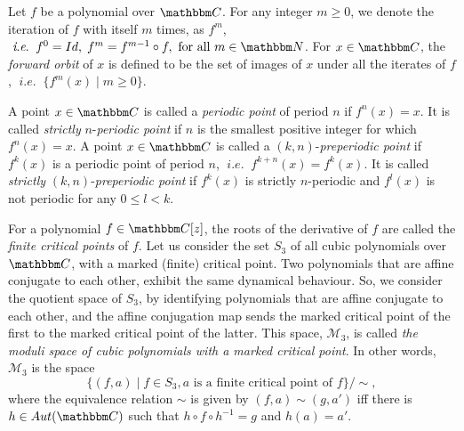 \documentclass[reqno]{amsart}
\numberwithin{equation}{section}
\theoremstyle{plain}
\theoremstyle{definition}
\theoremstyle{definition}
\newcommand{\C}{{\mathbbm C}}
\newcommand{\N}{{\mathbbm N}}
\newcommand{\ie}{\;\textit{i}.\textit{e}.\;\;}
\begin{document}
    Let $f$ be a polynomial over $\C$. For any integer $m\geq 0$, we denote the iteration of $f$ with itself $m$ times, as $f^{m}$, $\ie f^{0}= Id,\; f^{m}= f^{m-1} \circ f,\text{ for all } m\in \N$. For $x\in \C$, the \textit{forward orbit} of $x$ is defined to be the set of images of $x$ under all the iterates of $f$, $\ie \{f^{m}(x)\; |\;m \geq 0\}$.

    A point $x\in \C$ is called a \emph{periodic point} of period $n$ if $f^{n}(x)=x$. It is called \emph{strictly} $n$-\emph{periodic point} if $n$ is the smallest positive integer for which $f^{n}(x)=x$. A point $x\in \C$ is called a $(k,n)$-\emph{preperiodic point} if $f^{k}(x)$ is a periodic point of period $n$, $\ie f^{k+n}(x)=f^{k}(x)$. It is called \emph{strictly} $(k,n)$-\emph{preperiodic point} if $f^{k}(x)$ is strictly $n$-periodic and $f^{l}(x)$ is not periodic for any $0\leq l < k$. 

    For a polynomial $f\in \C[z]$, the roots of the derivative of $f$ are called the \emph{finite critical points} of $f$. Let us consider the set $S_{3}$ of all cubic polynomials over $\C$, with a marked (finite) critical point. Two polynomials that are affine conjugate to each other, exhibit the same dynamical behaviour. So, we consider the quotient space of $S_{3}$, by identifying polynomials that are affine conjugate to each other, and the affine conjugation map sends the marked critical point of the first to the marked critical point of the latter. This space, $\mathcal{M}_{3}$, is called \emph{the moduli space of cubic polynomials with a marked critical point}. In other words, $\mathcal{M}_{3}$ is the space 
    $$\{(f,a)\;|\; f \in S_{3}, a \text{ is a finite critical point of } f\}/ \sim ,$$ 
    where the equivalence relation $\sim$ is given by $(f,a) \sim (g,a')$ iff there is $h\in Aut(\C)$ such that $h\circ f\circ h^{-1}= g$ and $h(a)=a'$.
\end{document}
